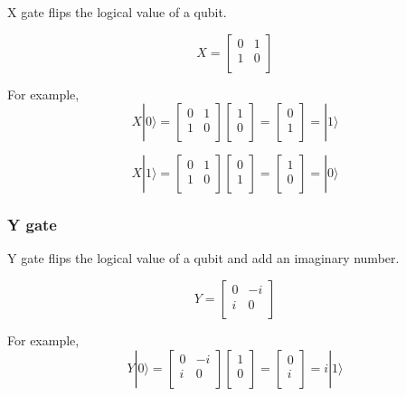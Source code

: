 X gate flips the logical value of a qubit.

$$ X = \begin{bmatrix}
0 & 1 \\
1 & 0 \\
\end{bmatrix}
$$

For example,
$$ X|0\rangle = \begin{bmatrix}
0 & 1 \\
1 & 0 \\
\end{bmatrix} 
\left[
\begin{array}{c}
1 \\
0 \\
\end{array}
\right]
= \left[
\begin{array}{c}
0 \\
1 \\
\end{array}
\right]
= |1\rangle
$$

$$ X|1\rangle = \begin{bmatrix}
0 & 1 \\
1 & 0 \\
\end{bmatrix} 
\left[
\begin{array}{c}
0 \\
1  \\
\end{array}
\right]
= \left[
\begin{array}{c}
1 \\
0 \\
\end{array}
\right]
= |0\rangle
$$

\subsubsection{Y gate}

Y gate flips the logical value of a qubit and add an imaginary number.

$$ Y = \begin{bmatrix}
0 & -i \\
i & 0 \\
\end{bmatrix}
$$

For example,
$$ Y|0\rangle = \begin{bmatrix}
0 & -i \\
i & 0 \\
\end{bmatrix} 
\left[
\begin{array}{c}
1 \\
0 \\
\end{array}
\right]
= \left[
\begin{array}{c}
0 \\
i \\
\end{array}
\right]
= i|1\rangle
$$

